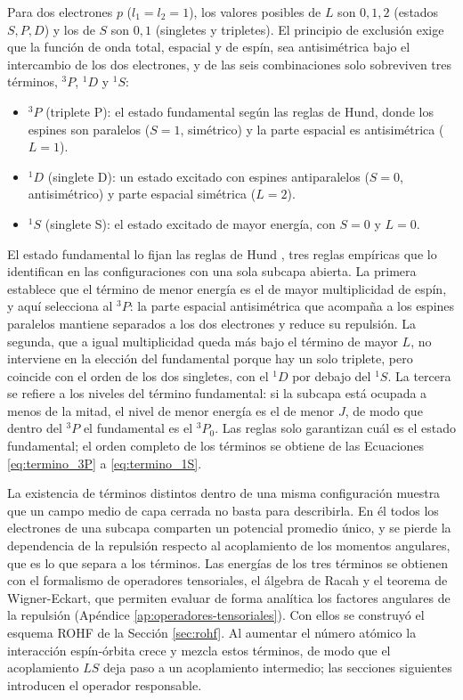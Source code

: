 Para dos electrones $p$ ($l_1 = l_2 = 1$), los valores posibles de $L$ son $0, 1, 2$ (estados $S, P, D$) y los de $S$ son $0, 1$ (singletes y tripletes). El principio de exclusión exige que la función de onda total, espacial y de espín, sea antisimétrica bajo el intercambio de los dos electrones, y de las seis combinaciones solo sobreviven tres términos, $^3P$, $^1D$ y $^1S$:
\begin{itemize}
    \item $^3P$ (triplete P): el estado fundamental según las reglas de Hund, donde los espines son paralelos ($S=1$, simétrico) y la parte espacial es antisimétrica ($L=1$).
    \item $^1D$ (singlete D): un estado excitado con espines antiparalelos ($S=0$, antisimétrico) y parte espacial simétrica ($L=2$).
    \item $^1S$ (singlete S): el estado excitado de mayor energía, con $S=0$ y $L=0$.
\end{itemize}

El estado fundamental lo fijan las reglas de Hund \parencite[Sección 4-16]{Cowan1981}, tres reglas empíricas que lo identifican en las configuraciones con una sola subcapa abierta. La primera establece que el término de menor energía es el de mayor multiplicidad de espín, y aquí selecciona al $^3P$: la parte espacial antisimétrica que acompaña a los espines paralelos mantiene separados a los dos electrones y reduce su repulsión. La segunda, que a igual multiplicidad queda más bajo el término de mayor $L$, no interviene en la elección del fundamental porque hay un solo triplete, pero coincide con el orden de los dos singletes, con el $^1D$ por debajo del $^1S$. La tercera se refiere a los niveles del término fundamental: si la subcapa está ocupada a menos de la mitad, el nivel de menor energía es el de menor $J$, de modo que dentro del $^3P$ el fundamental es el $^3P_0$. Las reglas solo garantizan cuál es el estado fundamental; el orden completo de los términos se obtiene de las Ecuaciones \eqref{eq:termino_3P} a \eqref{eq:termino_1S}.

La existencia de términos distintos dentro de una misma configuración muestra que un campo medio de capa cerrada no basta para describirla. En él todos los electrones de una subcapa comparten un potencial promedio único, y se pierde la dependencia de la repulsión respecto al acoplamiento de los momentos angulares, que es lo que separa a los términos. Las energías de los tres términos se obtienen con el formalismo de operadores tensoriales, el álgebra de Racah y el teorema de Wigner-Eckart, que permiten evaluar de forma analítica los factores angulares de la repulsión (Apéndice \ref{ap:operadores-tensoriales}). Con ellos se construyó el esquema ROHF de la Sección \ref{sec:rohf}. Al aumentar el número atómico la interacción espín-órbita crece y mezcla estos términos, de modo que el acoplamiento $LS$ deja paso a un acoplamiento intermedio; las secciones siguientes introducen el operador responsable.

